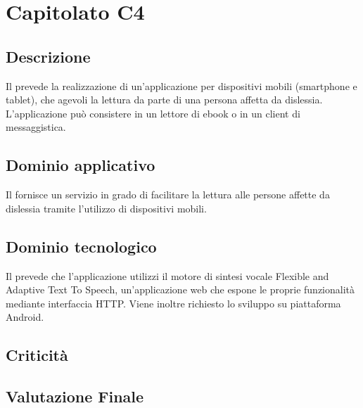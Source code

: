 \section {Capitolato C4}
	\subsection {Descrizione}
	Il  prevede la realizzazione di un'applicazione per dispositivi mobili (smartphone e tablet), che agevoli la
lettura da parte di una persona affetta da dislessia.  L'applicazione può consistere in un lettore di ebook o in un
client di messaggistica.
	\subsection {Dominio applicativo}
	Il  fornisce un servizio in grado di facilitare la lettura alle persone affette da dislessia tramite l'utilizzo di dispositivi mobili. 
	\subsection {Dominio tecnologico}
Il  prevede che l'applicazione utilizzi il motore di sintesi vocale Flexible and Adaptive Text To Speech, un'applicazione web che
espone le proprie funzionalità mediante interfaccia HTTP. Viene inoltre richiesto lo sviluppo su piattaforma Android.
	\subsection {Criticità}
	\subsection {Valutazione Finale}